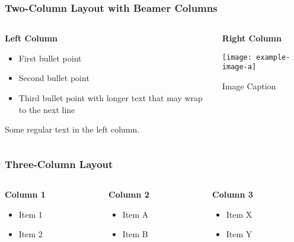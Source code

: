 \documentclass[aspectratio=169,professionalfonts]{beamer}
\begin{document}
\begin{frame}
    \frametitle{Two-Column Layout with Beamer Columns}
    
    \begin{columns}[T]
        \begin{column}{0.48\textwidth}
            \textbf{Left Column}
            \begin{itemize}
                \item First bullet point
                \item Second bullet point
                \item Third bullet point with longer text that may wrap to the next line
            \end{itemize}
            
            Some regular text in the left column.
        \end{column}
        
        \begin{column}{0.48\textwidth}
            \textbf{Right Column}
            
            \texttt{[image: example-image-a]}
            \centerline{\small Image Caption}
        \end{column}
    \end{columns}
\end{frame}

\begin{frame}
    \frametitle{Three-Column Layout}
    
    \begin{columns}[T]
        \begin{column}{0.3\textwidth}
            \textbf{Column 1}
            \begin{itemize}
                \item Item 1
                \item Item 2
            \end{itemize}
        \end{column}
        
        \begin{column}{0.3\textwidth}
            \textbf{Column 2}
            \begin{itemize}
                \item Item A
                \item Item B
            \end{itemize}
        \end{column}
        
        \begin{column}{0.3\textwidth}
            \textbf{Column 3}
            \begin{itemize}
                \item Item X
                \item Item Y
            \end{itemize}
        \end{column}
    \end{columns}
\end{frame}
\end{document}
